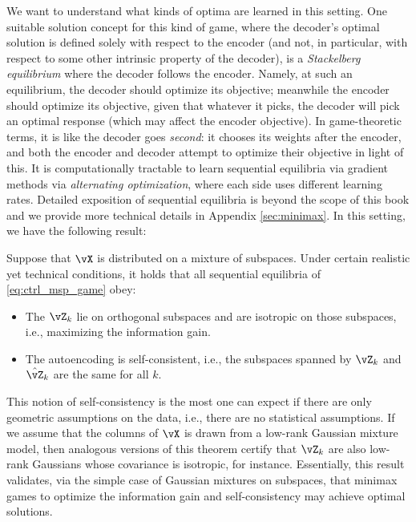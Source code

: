 \documentclass[\toplevelprefix/book-main.tex]{subfiles}
\begin{document}
We want to understand what kinds of optima are learned in this setting. One suitable solution concept for this kind of game, where the decoder's optimal solution is defined solely with respect to the encoder (and not, in particular, with respect to some other intrinsic property of the decoder), is a \textit{Stackelberg equilibrium} where the decoder follows the encoder. %
Namely, at such an equilibrium, the decoder should optimize its objective; meanwhile the encoder should optimize its objective, given that whatever it picks, the decoder will pick an optimal response (which may affect the encoder objective). In game-theoretic terms, it is like the decoder goes \textit{second}: it chooses its weights after the encoder, and both the encoder and decoder attempt to optimize their objective in light of this. It is computationally tractable to learn sequential equilibria via gradient methods via \textit{alternating optimization}, where each side uses different learning rates. Detailed exposition of sequential equilibria is beyond the scope of this book and we provide more technical details in Appendix \ref{sec:minimax}. In this setting, we have the following result:
\begin{theorem}\label{thm:ctrl_theory}
    Suppose that \(\vX\) is distributed on a mixture of subspaces. Under certain realistic yet technical conditions, it holds that all sequential equilibria of \eqref{eq:ctrl_msp_game} obey:
    \begin{itemize}
        \item The \(\vZ_{k}\) lie on orthogonal subspaces and are isotropic on those subspaces, i.e., maximizing the information gain.
        \item The autoencoding is self-consistent, i.e., the subspaces spanned by \(\vZ_{k}\) and \(\hat{\vZ}_{k}\) are the same for all \(k\).
    \end{itemize}
\end{theorem}
This notion of self-consistency is the most one can expect if there are only geometric assumptions on the data, i.e., there are no statistical assumptions. If we assume that the columns of \(\vX\) is drawn from a low-rank Gaussian mixture model, then analogous versions of this theorem certify that \(\vZ_{k}\) are also low-rank Gaussians whose covariance is isotropic, for instance. %
Essentially, this result validates, via the simple case of Gaussian mixtures on subspaces, that minimax games to optimize the information gain and self-consistency may achieve optimal solutions.
\end{document}
